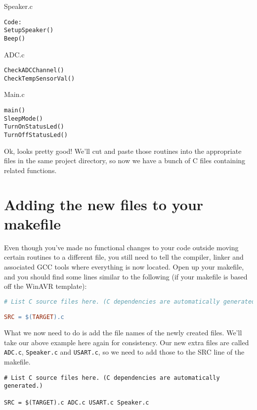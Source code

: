 \documentclass[a4paper,oneside,notitlepage]{article}
\begin{document}
Speaker.c
\begin{center}
\begin{lstlisting}
Code:
SetupSpeaker()
Beep()
\end{lstlisting}
\end{center}

ADC.c
\begin{center}
\begin{lstlisting}
CheckADCChannel()
CheckTempSensorVal()
\end{lstlisting}
\end{center}

Main.c
\begin{center}
\begin{lstlisting}
main()
SleepMode()
TurnOnStatusLed()
TurnOffStatusLed()
\end{lstlisting}
\end{center}

Ok, looks pretty good! We'll cut and paste those routines into the appropriate files in the same project directory, so now we have a bunch of C files containing related functions.

\section{Adding the new files to your makefile}

Even though you've made no functional changes to your code outside moving certain routines to a different file, you still need to tell the compiler, linker and associated GCC tools where everything is now located. Open up your makefile, and you should find some lines similar to the following (if your makefile is based off the WinAVR template):

\begin{center}
\begin{lstlisting}[language=make]
# List C source files here. (C dependencies are automatically generated.)

SRC = $(TARGET).c
\end{lstlisting}
\end{center}

What we now need to do is add the file names of the newly created files. We'll take our above example here again for consistency. Our new extra files are called \texttt{ADC.c}, \texttt{Speaker.c} and \texttt{USART.c}, so we need to add those to the SRC line of the makefile.

\begin{center}
\begin{lstlisting}
# List C source files here. (C dependencies are automatically generated.)

SRC = $(TARGET).c ADC.c USART.c Speaker.c
\end{lstlisting}
\end{center}
\end{document}
